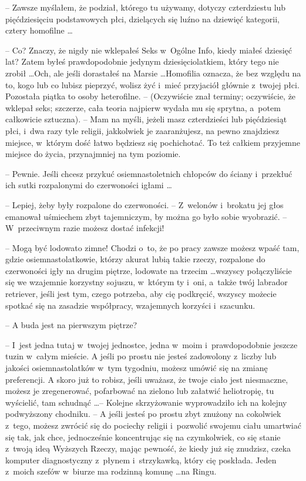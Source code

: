 \documentclass[oneside,polish,11pt,rmheadings]{mwbk}
\begin{document}
-- Zawsze myślałem, że podział, którego tu używamy, dotyczy czterdziestu lub pięćdziesięciu podstawowych płci, dzielących się luźno na dziewięć kategorii, cztery homofilne \ldots 

-- Co? Znaczy, że nigdy nie wklepałeś Seks w~Ogólne Info, kiedy miałeś dziesięć lat? Zatem byłeś prawdopodobnie jedynym dziesięciolatkiem, który tego nie zrobił \ldots  Och, ale jeśli dorastałeś na Marsie \ldots  Homofilia oznacza, że bez względu na to, kogo lub co lubisz pieprzyć, wolisz żyć i~mieć przyjaciół głównie z~twojej płci. Pozostała piątka to osoby heterofilne. -- (Oczywiście znał terminy; oczywiście, że wklepał seks; szczerze, cała teoria najpierw wydała mu się sprytna, a~potem całkowicie sztuczna). -- Mam na myśli, jeżeli masz czterdzieści lub pięćdziesiąt płci, i~dwa razy tyle religii, jakkolwiek je zaaranżujesz, na pewno znajdziesz miejsce, w~którym dość łatwo będziesz się pochichotać. To też całkiem przyjemne miejsce do życia, przynajmniej na tym poziomie. 

-- Pewnie. Jeśli chcesz przykuć osiemnastoletnich chłopców do ściany i~przekłuć ich sutki rozpalonymi do czerwoności igłami \ldots   

-- Lepiej, żeby były rozpalone do czerwoności. -- Z~welonów i~brokatu jej głos emanował uśmiechem zbyt tajemniczym, by można go było sobie wyobrazić. -- W~przeciwnym razie możesz dostać infekcji! 

-- Mogą być lodowato zimne! Chodzi o~to, że po pracy zawsze możesz wpaść tam, gdzie osiemnastolatkowie, którzy akurat lubią takie rzeczy, rozpalone do czerwoności igły na drugim piętrze, lodowate na trzecim \ldots  wszyscy połączyliście się we wzajemnie korzystny sojuszu, w~którym ty i~oni, a~także twój labrador retriever, jeśli jest tym, czego potrzeba, aby cię podkręcić, wszyscy możecie spotkać się na zasadzie współpracy, wzajemnych korzyści i~szacunku. 

-- A buda jest na pierwszym piętrze? 

-- I~jest jedna tutaj w~twojej jednostce, jedna w~moim i~prawdopodobnie jeszcze tuzin w~całym mieście. A jeśli po prostu nie jesteś zadowolony z~liczby lub jakości osiemnastolatków w~tym tygodniu, możesz umówić się na zmianę preferencji. A skoro już to robisz, jeśli uważasz, że twoje ciało jest niesmaczne, możesz je zregenerować, pofarbować na zielono lub załatwić heliotropię, tu wyścielić, tam schudnąć \ldots  -- Kolejne skrzyżowanie wyprowadziło ich na kolejny podwyższony chodniku. -- A jeśli jesteś po prostu zbyt znużony na cokolwiek z~tego, możesz zwrócić się do pociechy religii i~pozwolić swojemu ciału umartwiać się tak, jak chce, jednocześnie koncentrując się na czymkolwiek, co się stanie z~twoją ideą Wyższych Rzeczy, mając pewność, że kiedy już się znudzisz, czeka komputer diagnostyczny z~płynem i~strzykawką, który cię poskłada. Jeden z~moich szefów w~biurze ma rodzinną komunę \ldots  na Ringu. 
\end{document}
